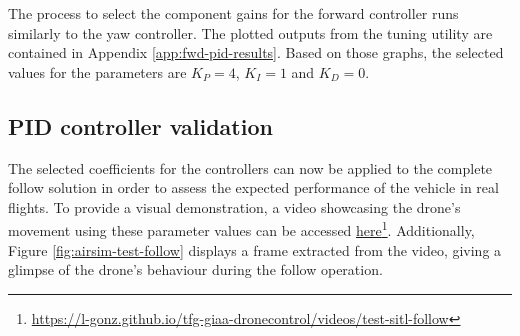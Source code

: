 The process to select the component gains for the forward controller runs similarly to the yaw controller. The plotted outputs from the tuning utility are contained in Appendix \ref{app:fwd-pid-results}. Based on those graphs, the selected values for the parameters are $K_P=4$, $K_I=1$ and $K_D=0$.


\subsection{PID controller validation}
\label{subsec:pid-test-controller}


The selected coefficients for the controllers can now be applied to the complete follow solution in order to assess the expected performance of the vehicle in real flights. To provide a visual demonstration, a video showcasing the drone's movement using these parameter values can be accessed \href{https://l-gonz.github.io/tfg-giaa-dronecontrol/videos/test-sitl-follow}{here}\footnote{\url{https://l-gonz.github.io/tfg-giaa-dronecontrol/videos/test-sitl-follow}}. Additionally, Figure \ref{fig:airsim-test-follow} displays a frame extracted from the video, giving a glimpse of the drone's behaviour during the follow operation.

